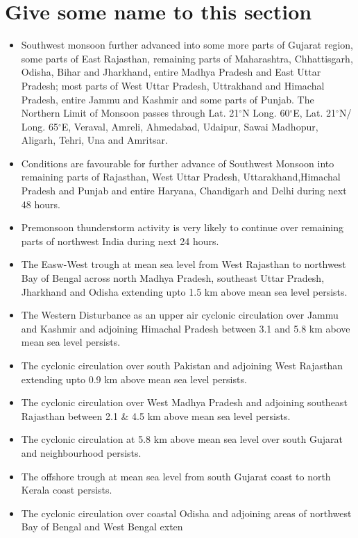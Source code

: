 \documentclass[10pt,a4paper]{article} %
\begin{document}
\section{Give some name to this section}
\begin{multicols}{2} %
\begin{itemize}
\item Southwest monsoon further advanced into some more parts of Gujarat region, some parts of East Rajasthan,
remaining parts of Maharashtra, Chhattisgarh, Odisha, Bihar and Jharkhand, entire Madhya Pradesh and East Uttar Pradesh;
most parts of West Uttar Pradesh, Uttrakhand and Himachal Pradesh, entire Jammu and Kashmir and some parts of Punjab. The Northern Limit of Monsoon passes through Lat. 21$^\circ$N Long. 60$^\circ$E, Lat. 21$^\circ$N/ Long. 65$^\circ$E, Veraval, Amreli, Ahmedabad, Udaipur, Sawai Madhopur, Aligarh, Tehri, Una and Amritsar.

\item Conditions are favourable for further advance of Southwest Monsoon into remaining parts of Rajasthan, West Uttar Pradesh,
Uttarakhand,Himachal Pradesh and Punjab and entire Haryana, Chandigarh and Delhi during next 48 hours.

\item Premonsoon thunderstorm activity is very likely to continue over remaining parts of northwest
India during next 24 hours.

\item The Easw-West trough at mean sea level from West Rajasthan to northwest Bay of Bengal across north Madhya Pradesh,
southeast Uttar Pradesh, Jharkhand and Odisha extending upto 1.5 km above mean sea level persists.

\item The Western Disturbance as an upper air cyclonic circulation over Jammu and Kashmir and adjoining Himachal Pradesh between 3.1 and 5.8 km above mean sea level persists. 

\item The cyclonic circulation over south Pakistan and adjoining West Rajasthan extending upto 0.9 km above mean sea level persists.

\item The cyclonic circulation over West Madhya Pradesh and adjoining southeast Rajasthan between 2.1 \& 4.5 km above mean sea
level persists.

\item The cyclonic circulation at 5.8 km above mean sea level over south Gujarat and neighbourhood persists.

\item The offshore trough at mean sea level from south Gujarat coast to north Kerala coast persists.

\item The cyclonic circulation over coastal Odisha and adjoining areas of northwest Bay of Bengal and West Bengal exten
\end{itemize}

\end{multicols}
\end{document}
